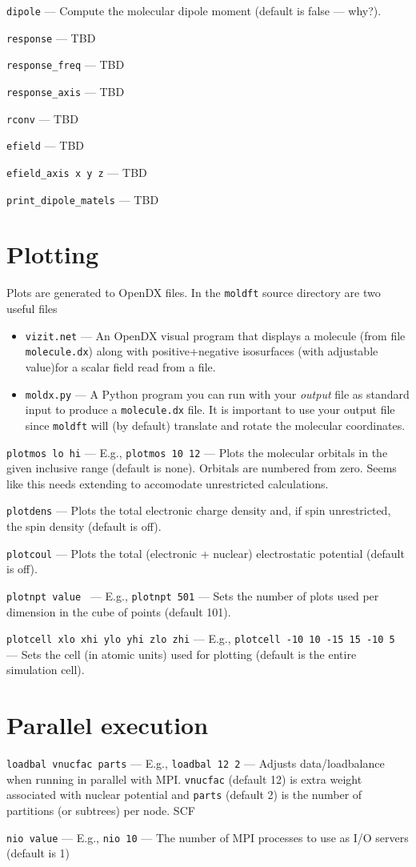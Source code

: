 \documentclass[letterpaper]{book}
\begin{document}
{\tt dipole} --- Compute the molecular dipole moment (default is false --- why?).

{\tt response} --- TBD

{\tt response\_freq} ---  TBD

{\tt response\_axis} --- TBD

{\tt rconv} --- TBD

{\tt efield} --- TBD

{\tt efield\_axis x y z} --- TBD

{\tt print\_dipole\_matels} --- TBD

\section{Plotting}

Plots are generated to OpenDX files.  In the {\tt moldft} source directory are two useful files

\begin{itemize}
\item {\tt vizit.net} --- An OpenDX visual program that displays a
  molecule (from file {\tt molecule.dx}) along with positive+negative
  isosurfaces (with adjustable value)for a scalar field read from a
  file.

\item {\tt moldx.py} --- A Python program you can run with your {\em
  output} file as standard input to produce a {\tt molecule.dx} file.
  It is important to use your output file since {\tt moldft} will (by
  default) translate and rotate the molecular coordinates.
  
\end{itemize}

{\tt plotmos lo hi} --- E.g., {\tt plotmos 10 12} --- Plots the molecular orbitals in the given inclusive range (default is none).  Orbitals are numbered from zero.  Seems like this needs extending to accomodate unrestricted calculations.

{\tt plotdens} --- Plots the total electronic charge density and, if spin unrestricted, the spin density (default is off).

{\tt plotcoul} --- Plots the total (electronic + nuclear) electrostatic potential (default is off).

{\tt plotnpt value } --- E.g., {\tt plotnpt 501} --- Sets the number of plots used per dimension in the cube of points (default 101).

{\tt plotcell xlo xhi ylo yhi zlo zhi} --- E.g., {\tt plotcell -10 10 -15 15 -10 5} --- Sets the cell (in atomic units) used for plotting (default is the entire simulation cell).

\section{Parallel execution}

{\tt loadbal vnucfac parts} --- E.g., {\tt loadbal 12 2} --- Adjusts data/loadbalance when running in parallel with MPI.  {\tt vnucfac} (default 12) is extra weight associated with nuclear potential and {\tt parts} (default 2) is the number of partitions (or subtrees) per node.  SCF

{\tt nio value} --- E.g., {\tt nio 10} --- The number of MPI processes to use as I/O servers (default is 1)
\end{document}
